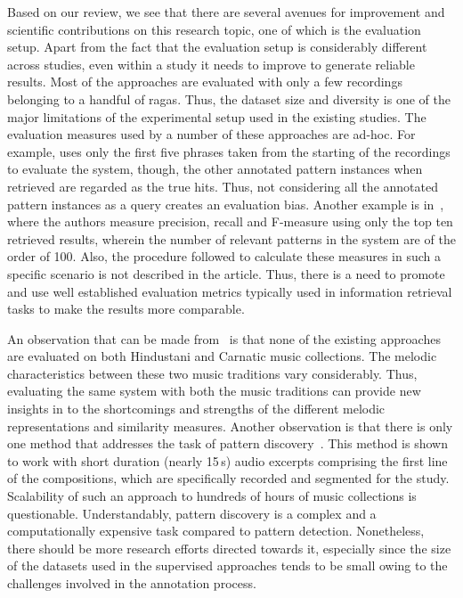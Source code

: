 Based on our review, we see that there are several avenues for improvement and scientific contributions on this research topic, one of which is the evaluation setup. Apart from the fact that the evaluation setup is considerably different across studies, even within a study it needs to improve to generate reliable results. Most of the approaches are evaluated with only a few recordings belonging to a handful of \glspl{raga}. Thus, the dataset size and diversity is one of the major limitations of the experimental setup used in the existing studies. The evaluation measures used by a number of these approaches are ad-hoc. For example, \cite{ganguli2015efficient} uses only the first five phrases taken from the starting of the recordings to evaluate the system, though, the other annotated pattern instances when retrieved are regarded as the true hits. Thus, not considering all the annotated pattern instances as a query creates an evaluation bias. Another example is in~\cite{Ishwar2013}, where the authors measure precision, recall and F-measure using only the top ten retrieved results, wherein the number of relevant patterns in the system are of the order of 100. Also, the procedure followed to calculate these measures in such a specific scenario is not described in the article. Thus, there is a need to promote and use well established evaluation metrics typically used in information retrieval tasks to make the results more comparable. 

An observation that can be made from~ is that none of the existing approaches are evaluated on both Hindustani and Carnatic music collections. The melodic characteristics between these two music traditions vary considerably. Thus, evaluating the same system with both the music traditions can provide new insights in to the shortcomings and strengths of the different melodic representations and similarity measures. Another observation is that there is only one method that addresses the task of pattern discovery~\citep{Dutta2014}. This method is shown to work with short duration (nearly 15\,s) audio excerpts comprising the first line of the compositions, which are specifically recorded and segmented for the study. Scalability of such an approach to hundreds of hours of music collections is questionable. Understandably, pattern discovery is a complex and a computationally expensive task compared to pattern detection. Nonetheless, there should be more research efforts directed towards it, especially since the size of the datasets used in the supervised approaches tends to be small owing to the challenges involved in the annotation process.


